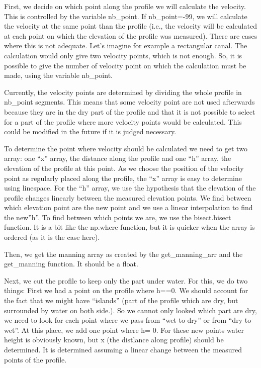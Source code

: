 \documentclass[letterpaper,10pt,english]{sphinxmanual}
\begin{document}
\begin{fulllineitems}

First, we decide on which point along the profile we will calculate the velocity. This is controlled by the
variable nb\_point. If nb\_point=-99, we will calculate the velocity at the same point than the profile (i.e., the
velocity will be calculated at each point on which the elevation of the profile was measured). There are cases where
this is not adequate. Let’s imagine for example a rectangular canal. The calculation would only give two velocity
points, which is not enough. So, it is possible to give the number of velocity point on which the calculation must
be made, using the variable nb\_point.

Currently, the velocity points are determined by dividing the whole profile in nb\_point segments. This means that
some velocity point are not used afterwards because they are in the dry part of the profile and that it is not
possible to select for a part of the profile where more velocity points would be calculated. This could be modified
in the future if it is judged necessary.

To determine the point where velocity should be calculated we need to get two array: one “x” array, the distance
along the profile and one “h” array, the elevation of the profile at this point. As we choose the position of the
velocity point as regularly placed along the profile, the “x” array is easy to determine using linespace. For the
“h” array, we use the hypothesis that the elevation of the profile changes linearly between the measured elevation
points. We find between which elevation point are the new point and we use a linear interpolation to find the new”h”.
To find between which points we are, we use the bisect.bisect function. It is a bit like the np.where function,
but it is quicker when the array is ordered (as it is the case here).

Then, we get the manning array as created by the get\_manning\_arr and the get\_manning function. It should be a float.

Next, we cut the profile to keep only the part under water. For this, we do two things: First we had a point on the
profile where h==0. We should account for the fact that we might have  “islands” (part of the profile which are
dry, but surrounded by water on both side.). So we cannot only looked which part are dry, we need to look
for each point where we pass from “wet to dry” or from “dry to wet”. At this place, we add one point where h= 0.
For these new points water height is obviously known, but x (the distlance along profile) should be determined.
It is determined assuming a linear change between the measured points of the profile.


\end{fulllineitems}
\end{document}
